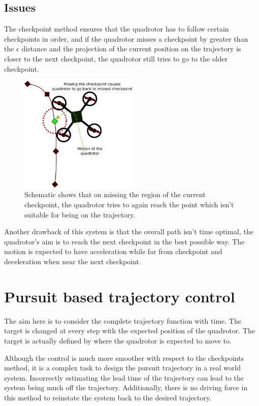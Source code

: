 \documentclass[hidelinks,BTech]{iitmdiss}
\begin{document}
	
\subsection*{Issues}
The checkpoint method ensures that the quadrotor has to follow certain checkpoints in order, and if the quadrotor misses a checkpoint by greater than the $\epsilon$ distance and the projection of the current position on the trajectory is closer to the next checkpoint, the quadrotor still tries to go to the older checkpoint.

\begin{figure}[H]
  \centering
    \includegraphics[width=0.5\textwidth]{Checkpoint_trajectory_miss.png}
     \caption{Schematic shows that on missing the region of the current checkpoint, the quadrotor tries to again reach the point which isn't suitable for being on the trajectory.}
\end{figure}


Another drawback of this system is that the overall path isn't time optimal, the quadrotor's aim is to reach the next checkpoint in the best possible way. The motion is expected to have acceleration while far from checkpoint and deceleration when near the next checkpoint.


\section{Pursuit based trajectory control}

The aim here is to consider the complete trajectory function with time. The target is changed at every step with the expected position of the quadrotor. The target is actually defined by where the quadrotor is expected to move to.

Although the control is much more smoother with respect to the checkpoints method, it is a complex task to design the pursuit trajectory in a real world system. Incorrectly estimating the lead time of the trajectory can lead to the system being much off the trajectory. Additionally, there is no driving force in this method to reinstate the system back to the desired trajectory.
\end{document}
